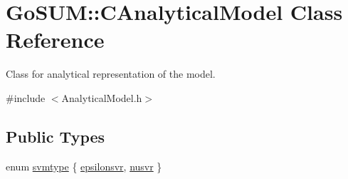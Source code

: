 \hypertarget{class_go_s_u_m_1_1_c_analytical_model}{\section{Go\-S\-U\-M\-:\-:C\-Analytical\-Model Class Reference}
\label{class_go_s_u_m_1_1_c_analytical_model}
}


Class for analytical representation of the model.  




{\ttfamily \#include $<$Analytical\-Model.\-h$>$}

\subsection*{Public Types}
\begin{DoxyCompactItemize}
\item 
enum \hyperlink{class_go_s_u_m_1_1_c_analytical_model_ad8bee3341d00a0c75e89c1a4376d6fbb}{svmtype} \{ \hyperlink{class_go_s_u_m_1_1_c_analytical_model_ad8bee3341d00a0c75e89c1a4376d6fbba57a67aad789d0e6d497f44cc2af4dcbe}{epsilonsvr}, 
\hyperlink{class_go_s_u_m_1_1_c_analytical_model_ad8bee3341d00a0c75e89c1a4376d6fbba5df7898d8ae62d31d25057570e7e15a8}{nusvr}
 \}
\end{DoxyCompactItemize}
